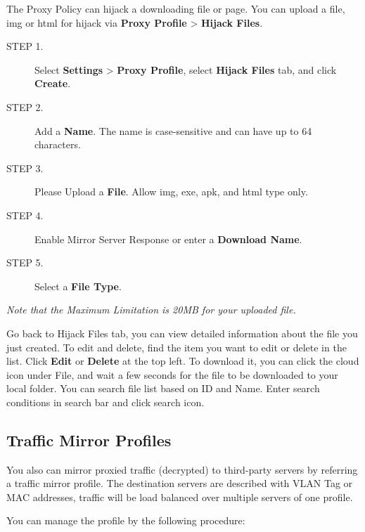 The Proxy Policy can hijack a downloading file or page. You can upload a file, img or html for hijack via \textbf{Proxy Profile} > \textbf{Hijack Files}.

\begin{description}
    \item[STEP 1.]	Select \textbf{Settings} > \textbf{Proxy Profile}, select \textbf{Hijack Files} tab, and click \textbf{Create}.
    \item[STEP 2.]	Add a \textbf{Name}. The name is case-sensitive and can have up to 64 characters.
    \item[STEP 3.]	Please Upload a \textbf{File}. Allow img, exe, apk, and html type only.
    \item[STEP 4.]	Enable Mirror Server Response or enter a \textbf{Download Name}. 
    \item[STEP 5.]	Select a \textbf{File Type}. 
\end{description} 

\notemark\textit{Note that the Maximum Limitation is 20MB for your uploaded file.}


Go back to Hijack Files tab, you can view detailed information about the file you just created. To edit and delete, find the item you want to edit or delete in the list. 
Click \textbf{Edit} or \textbf{Delete} at the top left. To download it, you can click the cloud icon under File, and wait a few seconds for the file to be downloaded to your local folder. 
You can search file list based on ID and Name. Enter search conditions in search bar and click search icon.

\subsection*{\hypertarget{link:Traffic Mirror Profiles}{Traffic Mirror Profiles}}
\label{sec:decrypt:profile:mirror}

You also can mirror proxied traffic (decrypted) to third-party servers by referring a traffic mirror profile. The destination servers are described with VLAN Tag or MAC addresses, traffic will be load balanced over multiple servers of one profile.


You can manage the profile by the following procedure:

